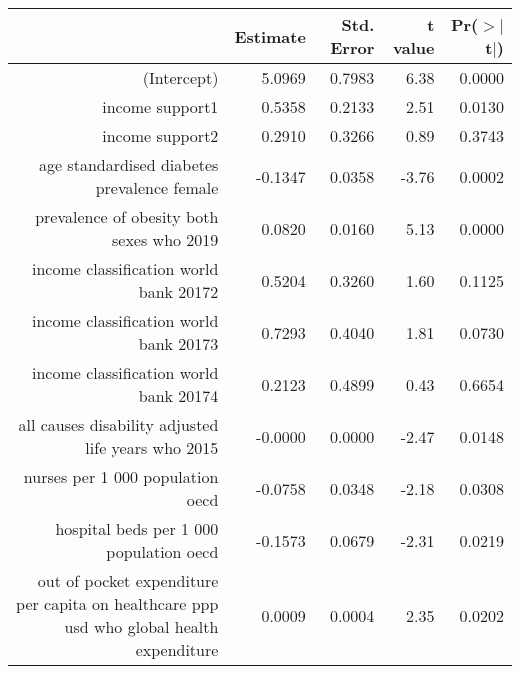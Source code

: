 \begin{table}[ht]
\centering
\begin{tabular}{rrrrr}
  \hline
 & Estimate & Std. Error & t value & Pr($>$$|$t$|$) \\ 
  \hline
(Intercept) & 5.0969 & 0.7983 & 6.38 & 0.0000 \\ 
  income support1 & 0.5358 & 0.2133 & 2.51 & 0.0130 \\ 
  income support2 & 0.2910 & 0.3266 & 0.89 & 0.3743 \\ 
  age standardised diabetes prevalence female & -0.1347 & 0.0358 & -3.76 & 0.0002 \\ 
  prevalence of obesity both sexes who 2019 & 0.0820 & 0.0160 & 5.13 & 0.0000 \\ 
  income classification world bank 20172 & 0.5204 & 0.3260 & 1.60 & 0.1125 \\ 
  income classification world bank 20173 & 0.7293 & 0.4040 & 1.81 & 0.0730 \\ 
  income classification world bank 20174 & 0.2123 & 0.4899 & 0.43 & 0.6654 \\ 
  all causes disability adjusted life years who 2015 & -0.0000 & 0.0000 & -2.47 & 0.0148 \\ 
  nurses per 1 000 population oecd & -0.0758 & 0.0348 & -2.18 & 0.0308 \\ 
  hospital beds per 1 000 population oecd & -0.1573 & 0.0679 & -2.31 & 0.0219 \\ 
  out of pocket expenditure per capita on healthcare ppp usd who global health expenditure & 0.0009 & 0.0004 & 2.35 & 0.0202 \\ 
   \hline
\end{tabular}
\end{table}
